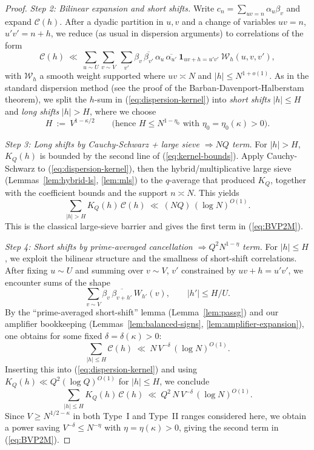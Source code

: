 \documentclass[11pt]{article}
\def\eqref#1{(\ref{#1})}%
\theoremstyle{definition}
\theoremstyle{remark}
\numberwithin{equation}{part}
\begin{document}
\begin{proof}
	\smallskip
	\emph{Step 2: Bilinear expansion and short shifts.}
	Write $c_n=\sum_{uv=n}\alpha_u\beta_v$ and expand $\mathcal C(h)$. After a dyadic partition in $u,v$ and a change of variables $uv=n$, $u'v'=n+h$, we reduce (as usual in dispersion arguments) to correlations of the form
	\begin{equation}\label{eq:Corr-uv}
		\mathcal C(h)\ \ll\ \sum_{u\sim U}\sum_{v\sim V}\ \sum_{v'} \beta_v\,\overline{\beta_{v'}}\, \alpha_u\,\overline{\alpha_{u'}}\ \mathbf 1_{uv+ h = u'v'}\ \mathcal W_{h}(u,v,v'),
	\end{equation}
	with $\mathcal W_h$ a smooth weight supported where $uv\asymp N$ and $|h|\le N^{1+o(1)}$. As in the standard dispersion method (see the proof of the Barban-Davenport-Halberstam theorem), we split the $h$-sum in \eqref{eq:dispersion-kernel} into \emph{short shifts} $|h|\le H$ and \emph{long shifts} $|h|>H$, where we choose
	\begin{equation}\label{eq:H-choice}
		H\ :=\ V^{1-\kappa/2}\qquad \text{(hence $H\le N^{1-\eta_0}$ with $\eta_0=\eta_0(\kappa)>0$)}.
	\end{equation}

	\smallskip
	\emph{Step 3: Long shifts by Cauchy-Schwarz + large sieve $\Rightarrow NQ$ term.}
	For $|h|>H$, $K_Q(h)$ is bounded by the second line of \eqref{eq:kernel-bounds}. Apply Cauchy-Schwarz to \eqref{eq:dispersion-kernel}, then the hybrid/multiplicative large sieve (Lemmas~\ref{lem:hybrid-ls}, \ref{lem:mls}) to the $q$-average that produced $K_Q$, together with the coefficient bounds and the support $n\asymp N$. This yields
	\[
		\sum_{|h|>H} K_Q(h)\, \mathcal C(h)\ \ll\ (NQ)\,(\log N)^{O(1)}.
	\]
	This is the classical large-sieve barrier and gives the first term in \eqref{eq:BVP2M}.

	\smallskip
	\emph{Step 4: Short shifts by prime-averaged cancellation $\Rightarrow Q^2 N^{1-\eta}$ term.}
	For $|h|\le H$, we exploit the bilinear structure and the smallness of short-shift correlations. After fixing $u\sim U$ and summing over $v\sim V$, $v'$ constrained by $uv+h=u'v'$, we encounter sums of the shape
	\[
		\sum_{v\sim V}\beta_v\,\overline{\beta_{v+h'}}\,W_{h'}(v),\qquad |h'|\le H/U.
	\]
	By the ``prime-averaged short-shift'' lemma (Lemma~\ref{lem:passg}) and our amplifier bookkeeping (Lemmas~\ref{lem:balanced-signs}, \ref{lem:amplifier-expansion}), one obtains for some fixed $\delta=\delta(\kappa)>0$:
	\[
		\sum_{|h|\le H}\mathcal C(h)\ \ll\ N\,V^{-\delta}\,(\log N)^{O(1)}.
	\]
	Inserting this into \eqref{eq:dispersion-kernel} and using $K_Q(h)\ll Q^2(\log Q)^{O(1)}$ for $|h|\le H$, we conclude
	\[
		\sum_{|h|\le H} K_Q(h)\,\mathcal C(h)\ \ll\ Q^2\,N\,V^{-\delta}\,(\log N)^{O(1)}.
	\]
	Since $V\ge N^{1/2-\kappa}$ in both Type~I and Type~II ranges considered here, we obtain a power saving $V^{-\delta}\le N^{-\eta}$ with $\eta=\eta(\kappa)>0$, giving the second term in \eqref{eq:BVP2M}.


\end{proof}
\end{document}
